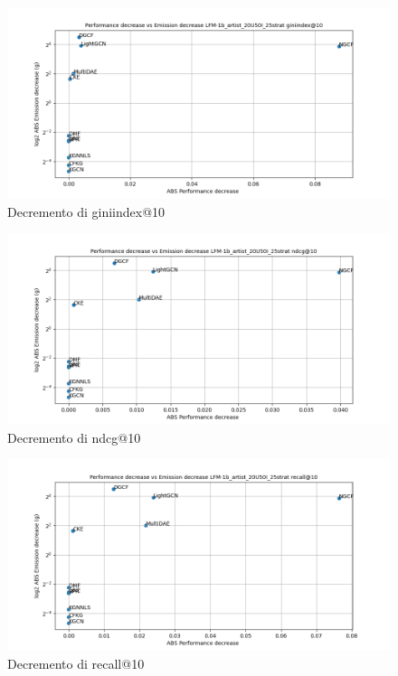 \begin{figure}[H]
    \centering
     \includegraphics[width=\textwidth]{images/decrement_giniindex@10_LFM-1b_artist_20U50I_25strat.png}
    \caption{Decremento di giniindex@10}
\end{figure}

\begin{figure}[H]
    \centering
     \includegraphics[width=\textwidth]{images/decrement_ndcg@10_LFM-1b_artist_20U50I_25strat.png}
    \caption{Decremento di ndcg@10}
\end{figure}

\begin{figure}[H]
    \centering
     \includegraphics[width=\textwidth]{images/decrement_recall@10_LFM-1b_artist_20U50I_25strat.png}
    \caption{Decremento di recall@10}
\end{figure}


